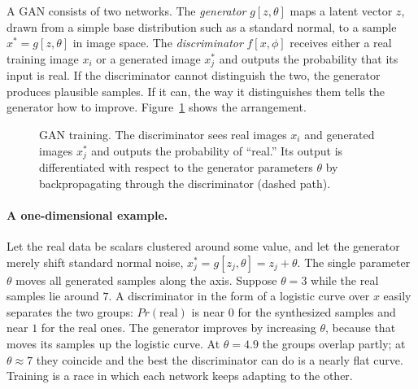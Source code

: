 A GAN consists of two networks. The \emph{generator} $g[z,\theta]$ maps a
latent vector $z$, drawn from a simple base distribution such as a standard
normal, to a sample $x^* = g[z,\theta]$ in image space. The
\emph{discriminator} $f[x,\phi]$ receives either a real training image $x_i$ or
a generated image $x_j^*$ and outputs the probability that its input is real.
If the discriminator cannot distinguish the two, the generator produces
plausible samples. If it can, the way it distinguishes them tells the generator
how to improve. Figure~\ref{fig:gan-pipeline} shows the arrangement.

\begin{figure}[ht]
  \centering
  \caption{GAN training. The discriminator sees real images $x_i$ and
  generated images $x_j^*$ and outputs the probability of ``real.'' Its output
  is differentiated with respect to the generator parameters $\theta$ by
  backpropagating through the discriminator (dashed path).}
  \label{fig:gan-pipeline}
\end{figure}

\paragraph{A one-dimensional example.}
Let the real data be scalars clustered around some value, and let the
generator merely shift standard normal noise, $x_j^* = g[z_j,\theta] = z_j +
\theta$. The single parameter $\theta$ moves all generated samples along the
axis. Suppose $\theta=3$ while the real samples lie around $7$. A
discriminator in the form of a logistic curve over $x$ easily separates the
two groups: $Pr(\text{real})$ is near $0$ for the synthesized samples and near
$1$ for the real ones. The generator improves by increasing $\theta$, because
that moves its samples up the logistic curve. At $\theta=4.9$ the groups
overlap partly; at $\theta\approx7$ they coincide and the best the
discriminator can do is a nearly flat curve. Training is a race in which each
network keeps adapting to the other.

